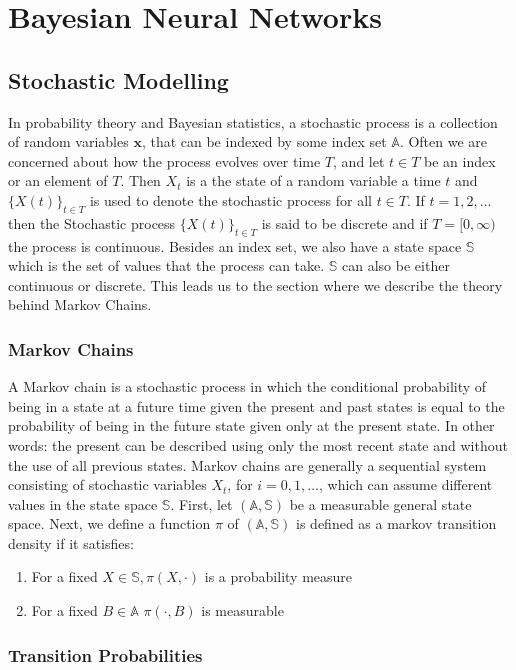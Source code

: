 \chapter{Bayesian Neural Networks}
\section{Stochastic Modelling}\label{sec:MarkovChain}
In probability theory and Bayesian statistics, a stochastic process is a collection of random variables $\mathbf{x}$, that can be indexed by some index set $\mathbb{A}$. Often we are concerned about how the process evolves over time $T$, and let $t\in T$ be an index or an element of $T$. Then $X_t$ is a the state of a random variable a time $t$ and $\{X(t)\}_{t \in T}$ is used to denote the stochastic process for all $t\in T$. If $t=1,2,\ldots$ then the Stochastic process $\{X(t)\}_{t \in T}$ is said to be discrete and if $T=[0, \infty)$ the process is continuous. Besides an index set, we also have a state space $\mathbb{S}$ which is the set of values that the process can take. $\mathbb{S}$ can also be either continuous or discrete. This leads us to the section where we describe the theory behind Markov Chains. 
\subsection{Markov Chains}
A Markov chain is a stochastic process in which the conditional probability of being in a state at a future time given the present and past states is equal to the probability of being in the future state given only at the present state. In other words: the present can be described using only the most recent state and without the use of all previous states.
Markov chains are generally a sequential system consisting of stochastic variables $X_t$, for $i=0,1,\ldots$, which can assume different values in the state space $\mathbb{S}$. First, let $(\mathbb{A}, \mathbb{S})$ be a measurable general state space. Next, we define a function $\pi$ of $(\mathbb{A}, \mathbb{S})$ is defined as a markov transition density if it satisfies:
\begin{enumerate}
    \item For a fixed $X \in \mathbb{S}, \pi (X, \cdot)$ is a probability measure
    \item For a fixed $B \in \mathbb{A}$ $\pi(\cdot, B)$ is measurable
\end{enumerate}


\subsection{Transition Probabilities}

